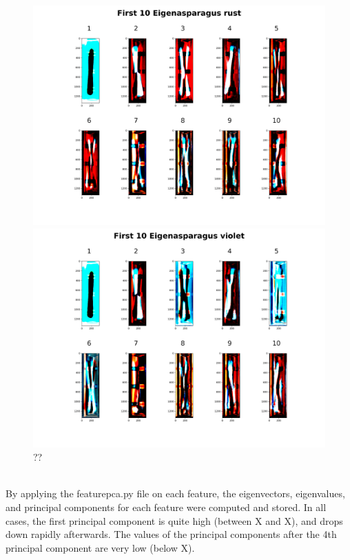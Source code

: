 \begin{figure}[h]
	\centering
	\includegraphics[scale=0.05]{Figures/chapter04/pc_rust}
	\decoRule
	\caption[??]{??}
	\label{fig:PrincipalComponentRust}
\bigbreak
	\includegraphics[scale=0.05]{Figures/chapter04/pc_violet}
	\decoRule
	\caption[??]{??}
	\label{fig:PrincipalComponentViolet}
\end{figure}
\\
By applying the feature\textunderscore pca.py file on each feature, the eigenvectors, eigenvalues, and principal components for each feature were computed and stored. In all cases, the first principal component is quite high (between X and X), and drops down rapidly afterwards. The values of the principal components after the 4th principal component are very low (below X). \\

